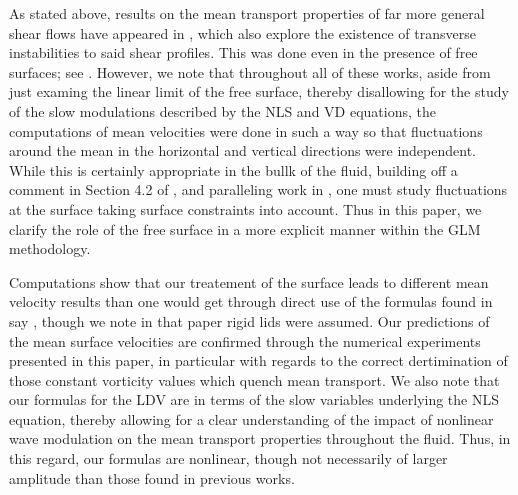 \documentclass{JFM_Style/jfm}
\begin{document}
As stated above, results on the mean transport properties of far more general shear flows have appeared in \cite{craik2, craik3, phillips1, phillips2}, which also explore the existence of transverse instabilities to said shear profiles.  This was done even in the presence of free surfaces; see \cite{phillips1,phillips2}.  However, we note that throughout all of these works, aside from just examing the linear limit of the free surface, thereby disallowing for the study of the slow modulations described by the NLS and VD equations, the computations of mean velocities were done in such a way so that fluctuations around the mean in the horizontal and vertical directions were independent.  While this is certainly appropriate in the bullk of the fluid,  building off a comment in Section 4.2 of \cite{andrews}, and paralleling work in \cite{ardhuin}, one must study fluctuations at the surface taking surface constraints into account.  Thus in this paper, we clarify the role of the free surface in a more explicit manner within the GLM methodology.

Computations show that our treatement of the surface leads to different mean velocity results than one would get through direct use of the formulas found in say \cite{craik2}, though we note in that paper rigid lids were assumed.  Our predictions of the mean surface velocities are confirmed through the numerical experiments presented in this paper, in particular with regards to the correct dertimination of those constant vorticity values which quench mean transport.  We also note that our formulas for the LDV are in terms of the slow variables underlying the NLS equation, thereby allowing for a clear understanding of the impact of nonlinear wave modulation on the mean transport properties throughout the fluid.  Thus, in this regard, our formulas are nonlinear, though not necessarily of larger amplitude than those found in previous works.
\end{document}
